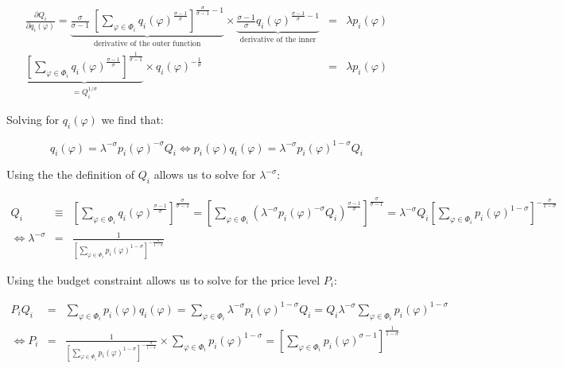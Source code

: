 \documentclass[11pt,letterpaper]{article}
\begin{document}
\begin{eqnarray*}
    \frac{\partial Q_i}{\partial q_{i}(\varphi)} = \underbrace{\frac{\sigma}{\sigma-1} \ \left[ \sum_{\varphi \in \Phi_i } q_i(
\varphi)^{\tfrac{\sigma-1}{\sigma}} \right]^{\tfrac{\sigma}{\sigma-1} -1}}_{\text{derivative of the outer function}} \times \underbrace{\frac{\sigma-1}{\sigma}   q_i(
\varphi)^{\tfrac{\sigma-1}{\sigma}-1}}_{\text{derivative of the inner}} &=& \lambda p_i(\varphi) \\
\underbrace{\left[ \sum_{\varphi \in \Phi_i } q_i(
\varphi)^{\tfrac{\sigma-1}{\sigma}} \right]^{\tfrac{1}{\sigma-1}}}_{=Q_i^{1/\sigma}} \times  q_i(
\varphi)^{-\tfrac{1}{\sigma}} &=& \lambda p_i(\varphi) 
\end{eqnarray*}

Solving for $q_i(\varphi)$ we find that:

\begin{equation*}
\boxed{
    q_i(
\varphi) = \lambda^{-\sigma} p_i(\varphi)^{-\sigma} Q_i \iff p_i(\varphi) q_i(
\varphi) = \lambda^{-\sigma} p_i(\varphi)^{1-\sigma} Q_i
}
\end{equation*}

Using the the definition of $Q_i$ allows us to solve for $\lambda^{-\sigma}$:

\begin{eqnarray*}
     Q_i &\equiv& \left[ \sum_{\varphi \in \Phi_i } q_i(
\varphi)^{\tfrac{\sigma-1}{\sigma}} \right]^{\tfrac{\sigma}{\sigma-1} }  = \left[ \sum_{\varphi \in \Phi_i } \left( \lambda^{-\sigma} p_i(\varphi)^{-\sigma} Q_i \right)^{\tfrac{\sigma-1}{\sigma}} \right]^{\tfrac{\sigma}{\sigma-1} } = \lambda^{-\sigma}  Q_i \left[ \sum_{\varphi \in \Phi_i }  p_i(\varphi) ^{1-\sigma} \right]^{-\tfrac{\sigma}{1-\sigma} } \\
\iff \lambda^{-\sigma} &=& \frac{1}{\left[ \sum_{\varphi \in \Phi_i }  p_i(\varphi) ^{1-\sigma} \right]^{-\tfrac{\sigma}{1-\sigma}} } 
\end{eqnarray*}

Using the budget constraint allows us to solve for the price level $P_i$:

\begin{eqnarray*}
    P_i Q_i &=& \sum_{\varphi \in \Phi_i } p_i(\varphi) q_i(\varphi) = \sum_{\varphi \in \Phi_i } \lambda^{-\sigma} p_i(\varphi)^{1-\sigma} Q_i = Q_i  \lambda^{-\sigma} \sum_{\varphi \in \Phi_i }  p_i(\varphi)^{1-\sigma} \\
    \iff P_i &=& \frac{1}{\left[ \sum_{\varphi \in \Phi_i }  p_i(\varphi) ^{1-\sigma} \right]^{-\tfrac{\sigma}{1-\sigma} }} \times  \sum_{\varphi \in \Phi_i }  p_i(\varphi)^{1-\sigma} = \left[ \sum_{\varphi \in \Phi_i }  p_i(\varphi) ^{\sigma-1} \right]^{\tfrac{1}{1-\sigma}} 
\end{eqnarray*}
\end{document}
